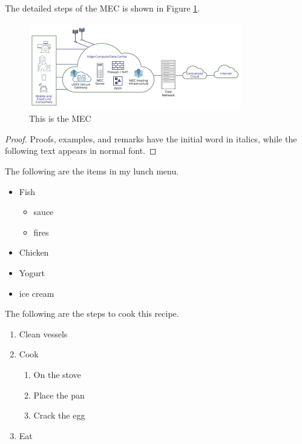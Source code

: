 \documentclass[runningheads]{llncs}
\begin{document}
The detailed steps of the MEC is shown in Figure \ref{mecFig}.

\begin{figure}
\includegraphics[width=\textwidth]{mecomputing.png}
\caption{This is the MEC} 
\label{mecFig}
\end{figure}

%
%
\begin{proof}
Proofs, examples, and remarks have the initial word in italics,
while the following text appears in normal font.
\end{proof}


The following are the items in my lunch menu.
\begin{itemize}
    \item Fish
    \begin{itemize}
        \item sauce
        \item fires
    \end{itemize}
    \item Chicken
    \item Yogurt
    \item ice cream
\end{itemize}

The following are the steps to cook this recipe. 



\begin{enumerate}
\item Clean vessels
\item Cook
\begin{enumerate}
    \item On the stove
    \item Place the pan
    \item Crack the egg
\end{enumerate}
\item Eat
\end{enumerate}
\end{document}
